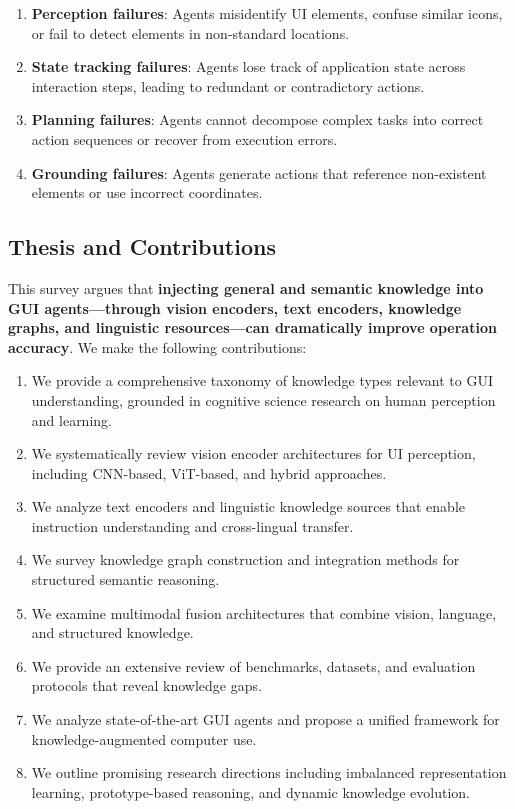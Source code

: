 \documentclass[11pt]{article}
\begin{document}
\begin{enumerate}
    \item \textbf{Perception failures}: Agents misidentify UI elements, confuse similar icons, or fail to detect elements in non-standard locations.
    \item \textbf{State tracking failures}: Agents lose track of application state across interaction steps, leading to redundant or contradictory actions.
    \item \textbf{Planning failures}: Agents cannot decompose complex tasks into correct action sequences or recover from execution errors.
    \item \textbf{Grounding failures}: Agents generate actions that reference non-existent elements or use incorrect coordinates.
\end{enumerate}

\subsection{Thesis and Contributions}

This survey argues that \textbf{injecting general and semantic knowledge into GUI agents---through vision encoders, text encoders, knowledge graphs, and linguistic resources---can dramatically improve operation accuracy}. We make the following contributions:

\begin{enumerate}
    \item We provide a comprehensive taxonomy of knowledge types relevant to GUI understanding, grounded in cognitive science research on human perception and learning.
    \item We systematically review vision encoder architectures for UI perception, including CNN-based, ViT-based, and hybrid approaches.
    \item We analyze text encoders and linguistic knowledge sources that enable instruction understanding and cross-lingual transfer.
    \item We survey knowledge graph construction and integration methods for structured semantic reasoning.
    \item We examine multimodal fusion architectures that combine vision, language, and structured knowledge.
    \item We provide an extensive review of benchmarks, datasets, and evaluation protocols that reveal knowledge gaps.
    \item We analyze state-of-the-art GUI agents and propose a unified framework for knowledge-augmented computer use.
    \item We outline promising research directions including imbalanced representation learning, prototype-based reasoning, and dynamic knowledge evolution.
\end{enumerate}
\end{document}
